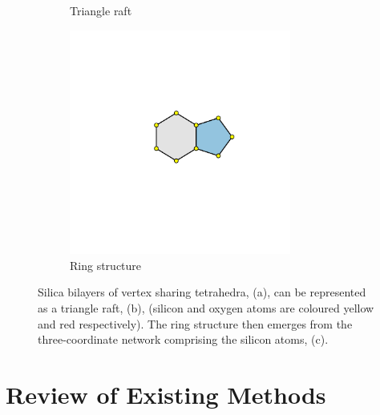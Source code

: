 \begin{figure}[bt]
\begin{subfigure}[b]{0.3\textwidth}
         \caption{Triangle raft}
         \label{fig:bilayer2}
     \end{subfigure}
     \hfill
     \begin{subfigure}[b]{0.3\textwidth}
         \centering
         \includegraphics[width=0.8\textwidth]{./figures/bilayers/mx2_bilayer_3.pdf}
         \vspace{5mm}
         \caption{Ring structure}
         \label{fig:bilayer3}
     \end{subfigure}
     \hfill
     
     \caption{Silica bilayers of vertex sharing tetrahedra, (a), can be represented as a \td{} triangle raft, (b), (silicon and oxygen atoms are coloured yellow and red respectively). The ring structure then emerges from the three\--coordinate network comprising the silicon atoms, (c).}
     \label{fig:bilayer}
\end{figure}

\section{Review of Existing Methods}
\label{s:triraftexisting}

